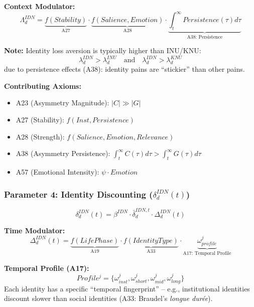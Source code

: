 \textbf{Context Modulator:}
\begin{equation}
\Lambda^{IDN}_d = \underbrace{f(Stability)}_{\text{A27}} \cdot 
                  \underbrace{f(Salience, Emotion)}_{\text{A28}} \cdot 
                  \underbrace{\int_t^\infty Persistence(\tau) d\tau}_{\text{A38: Persistence}}
\end{equation}

\textbf{Note:} Identity loss aversion is typically higher than INU/KNU:
\begin{equation}
\lambda^{IDN}_d > \lambda^{INU}_d \quad \text{and} \quad \lambda^{IDN}_d > \lambda^{KNU}_d
\end{equation}
due to persistence effects (A38): identity pains are ``stickier'' than other pains.

\textbf{Contributing Axioms:}
\begin{itemize}
\item A23 (Asymmetry Magnitude): $|C| \gg |G|$
\item A27 (Stability): $f(Inst, Persistence)$
\item A28 (Strength): $f(Salience, Emotion, Relevance)$
\item A38 (Asymmetry Persistence): $\int_t^\infty C(\tau) d\tau > \int_t^\infty G(\tau) d\tau$
\item A57 (Emotional Intensity): $\psi \cdot Emotion$
\end{itemize}

\subsubsection{Parameter 4: Identity Discounting ($\delta^{IDN}_{d}(t)$)}

\begin{tcolorbox}[colback=orange!5!white, colframe=orange!50!black]
\begin{equation}
\boxed{
\delta^{IDN}_{d}(t) = \beta^{IDN} \cdot \bar{\delta}^{IDN,t}_d \cdot \Delta^{IDN}_d(t)
}
\end{equation}
\end{tcolorbox}

\textbf{Time Modulator:}
\begin{equation}
\Delta^{IDN}_d(t) = \underbrace{f(LifePhase)}_{\text{A19}} \cdot 
                    \underbrace{f(IdentityType)}_{\text{A33}} \cdot 
                    \underbrace{\omega_{profile}^j}_{\text{A17: Temporal Profile}}
\end{equation}

\textbf{Temporal Profile (A17):}
\begin{equation}
Profile^j = \{\omega_{inst}^j, \omega_{short}^j, \omega_{mid}^j, \omega_{long}^j\}
\end{equation}
Each identity has a specific ``temporal fingerprint'' -- e.g., institutional identities 
discount slower than social identities (A33: Braudel's \textit{longue durée}).


